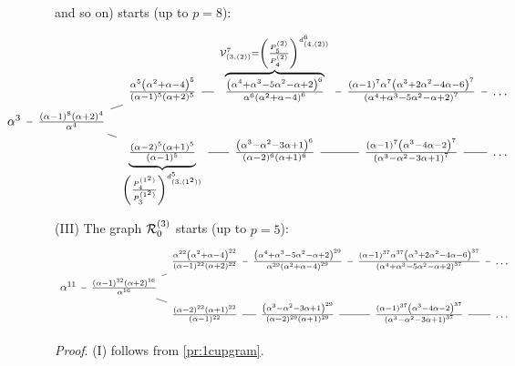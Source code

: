 \begin{proposition}
{and so on)} 
starts (up to $p=8$):  %
\[  \hspace{-1.5cm} 
\begin{tikzcd}[row sep=0em,column sep=0.5em]
&&\frac{\alpha ^5 \left(\alpha ^2+\alpha -4\right)^5}{(\alpha -1)^5 (\alpha +2)^5}\ar[r,dash]
  &
  \overbrace{
\tfrac{\left(\alpha ^4+\alpha ^3-5 \alpha ^2-\alpha +2\right)^6}{\alpha ^6 \left(\alpha ^2+\alpha -4\right)^6} 
 }^{\V^7_{(3,(2))} = \left( \frac{ P^{(2)}_{5}}{P^{(2)}_{4}} \right)^{d^6_{(4,(2))}} }  \ar[r,dash]
  &
  \frac{(\alpha -1)^7 \alpha ^7 \left(\alpha ^3+2 \alpha ^2-4 \alpha -6\right)^7}{\left(\alpha ^4+\alpha ^3-5 \alpha ^2-\alpha +2\right)^7}\ar[r,dash]
  & \dots
  \\
    \alpha^3\ar[r,dash]&\frac{(\alpha -1)^8 (\alpha +2)^4}{\alpha ^4}\ar[ur,dash]\ar[dr,dash]
    \\
    &&
    \underbrace{
    \tfrac{(\alpha -2)^5 (\alpha +1)^5}{(\alpha -1)^5}   }_{ \left( \frac{ P^{(1^2)}_{4}}{P^{(1^2)}_{3}} \right)^{d^5_{(3,(1^2))}} }   \ar[r,dash]
      &
      \frac{\left(\alpha ^3-\alpha ^2-3 \alpha +1\right)^6}{(\alpha -2)^6 (\alpha +1)^6}\ar[r,dash]
      &
      \frac{(\alpha -1)^7 \left(\alpha ^3-4 \alpha -2\right)^7}{\left(\alpha ^3-\alpha ^2-3 \alpha +1\right)^7}\ar[r,dash]
      & \dots
\end{tikzcd}
\]
(III)
The graph ${\mathcal{R}}^{(3)}_0$ starts (up to $p=5$):
\[\begin{tikzcd}[row sep=0em,column sep=0.5em]&&\frac{\alpha ^{22} \left(\alpha ^2+\alpha -4\right)^{22}}{(\alpha -1)^{22} (\alpha +2)^{22}}\ar[r,dash]&\frac{\left(\alpha ^4+\alpha ^3-5 \alpha ^2-\alpha +2\right)^{29}}{\alpha ^{29} \left(\alpha ^2+\alpha -4\right)^{29}}\ar[r,dash]&\frac{(\alpha -1)^{37} \alpha ^{37} \left(\alpha ^3+2 \alpha ^2-4 \alpha -6\right)^{37}}{\left(\alpha ^4+\alpha ^3-5 \alpha ^2-\alpha +2\right)^{37}}\ar[r,dash]&\dots\\
    \alpha^{11}\ar[r,dash]&\frac{(\alpha -1)^{32} (\alpha +2)^{16}}{\alpha ^{16}}\ar[ur,dash]\ar[dr,dash]\\
    &&\frac{(\alpha -2)^{22} (\alpha +1)^{22}}{(\alpha -1)^{22}}\ar[r,dash]&\frac{\left(\alpha ^3-\alpha ^2-3 \alpha +1\right)^{29}}{(\alpha -2)^{29} (\alpha +1)^{29}}\ar[r,dash]&\frac{(\alpha -1)^{37} \left(\alpha ^3-4 \alpha -2\right)^{37}}{\left(\alpha ^3-\alpha ^2-3 \alpha +1\right)^{37}}\ar[r,dash]&\dots
\end{tikzcd}\]
\end{proposition}
\noindent 
{\em Proof}. 
(I) follows from \ref{pr:1cupgram}. 

